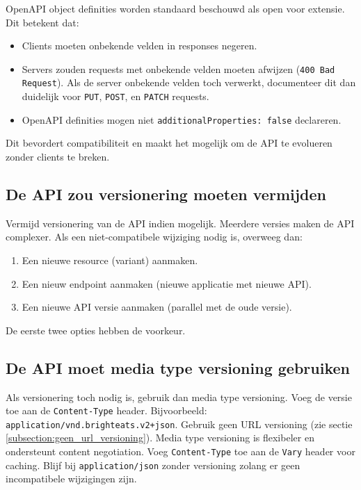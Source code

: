 OpenAPI object definities worden standaard beschouwd als open voor extensie. Dit betekent dat:

\begin{itemize}
    \item Clients moeten onbekende velden in responses negeren.
    \item Servers zouden requests met onbekende velden moeten afwijzen (\texttt{400 Bad Request}). Als de server onbekende velden toch verwerkt, documenteer dit dan duidelijk voor \texttt{PUT}, \texttt{POST}, en \texttt{PATCH} requests.
    \item OpenAPI definities mogen niet \texttt{additionalProperties: false} declareren.
\end{itemize}

Dit bevordert compatibiliteit en maakt het mogelijk om de API te evolueren zonder clients te breken.

\subsection{De API zou versionering moeten vermijden}
\label{subsection:versionering}

Vermijd versionering van de API indien mogelijk. Meerdere versies maken de API complexer. Als een niet-compatibele wijziging nodig is, overweeg dan:

\begin{enumerate}
    \item Een nieuwe resource (variant) aanmaken.
    \item Een nieuw endpoint aanmaken (nieuwe applicatie met nieuwe API).
    \item Een nieuwe API versie aanmaken (parallel met de oude versie).
\end{enumerate}

De eerste twee opties hebben de voorkeur.

\subsection{De API moet media type versioning gebruiken}
\label{subsection:media_type_versioning}

Als versionering toch nodig is, gebruik dan media type versioning. Voeg de versie toe aan de \texttt{Content-Type} header. Bijvoorbeeld: \texttt{application/vnd.brighteats.v2+json}. Gebruik geen URL versioning (zie sectie \ref{subsection:geen_url_versioning}). Media type versioning is flexibeler en ondersteunt content negotiation. Voeg \texttt{Content-Type} toe aan de \texttt{Vary} header voor caching. Blijf bij \texttt{application/json} zonder versioning zolang er geen incompatibele wijzigingen zijn.


